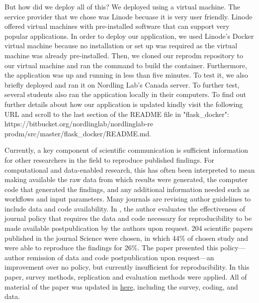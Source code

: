 \documentclass[
10pt, %
a4paper, %
oneside, %
headinclude,footinclude, %
BCOR5mm, %
]{scrartcl}
\begin{document}
But how did we deploy all of this? We deployed using a virtual machine. The service provider that we chose was Linode becuase it is very user  friendly. Linode offered virtual machines with pre-installed software that can support very popular applications. In order to deploy our application, we used Linode's Docker virtual machine 
because no installation or set up was required as the virtual machine was already pre-installed.
Then, we cloned our reprodm repository to our virtual machine and ran the command to build the container. Furthermore, the application  was up and running in less than five minutes. To test it, we also briefly deployed and ran it on Nordling Lab's Canada server. To further test, several students also ran the appiication locally in their 
computers. To find out further details about how our application  is updated kindly visit the following URL and scroll to the last section of the README file in "flask{\_}docker": https://bitbucket.org/nordlinglab/nordlinglab-re\\prodm/src/master/flask{\_}docker/README.md.


Currently, a key component of scientific communication is sufficient information for other researchers in the field to reproduce published findings. For computational and data-enabled research, this has often been interpreted to mean 
making available the raw data from which results were generated, the computer code that generated the findings, and any additional information needed such as workflows and input parameters. Many journals are revising author guidelines to include 
data and code availability. In \cite{stodden2018empirical}, the author evaluates the effectiveness of journal policy that requires the data and code necessary for reproducibility to be made available postpublication by the authors upon request.
204 scientific papers published in the journal Science were chosen, in which 44\% of chosen study and were able to reproduce the findings for 26\%. The paper presented this policy—author remission of data and code postpublication upon request—an improvement over no policy, but currently insufficient for reproducibility. In this paper, survey methods, replication and evaluation methods were applied. All of material of the paper was updated in \href{https://github.com/ReproducibilityInPublishing/Science-2018}{here}, including the survey, coding, and data.
\end{document}
